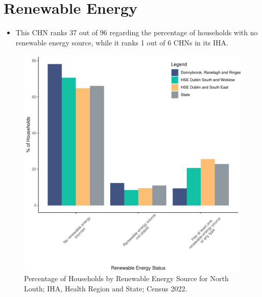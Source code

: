 \documentclass{article}
\begin{document}
\section{Renewable Energy}\label{sect:RE}
\begin{itemize}
\item This CHN ranks  37 out of 96 regarding the percentage of households with no renewable energy source, while it ranks   1 out of 6 CHNs in its IHA.
\end{itemize}
\begin{figure}[H]
	\centering
	\includegraphics[width = 140mm]{../figures/RenewableEnergyED.pdf}
	\caption{Percentage of Households by Renewable Energy Source for North Louth; IHA, Health Region and State; Census 2022.}
	\label{fig:vbnv}
	\end{figure}
\end{document}
